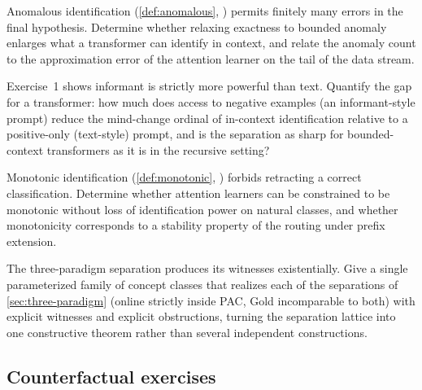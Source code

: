 \begin{openprob}
\label{op:anomalous-icl}
Anomalous identification (\cref{def:anomalous}, ) permits finitely many errors in the final hypothesis.  Determine whether relaxing exactness to bounded anomaly enlarges what a transformer can identify in context, and relate the anomaly count to the approximation error of the attention learner on the tail of the data stream.
\end{openprob}

\begin{openprob}
\label{op:informant-attention}
Exercise~1 shows informant is strictly more powerful than text.  Quantify the gap for a transformer: how much does access to negative examples (an informant-style prompt) reduce the mind-change ordinal of in-context identification relative to a positive-only (text-style) prompt, and is the separation as sharp for bounded-context transformers as it is in the recursive setting?
\end{openprob}

\begin{openprob}
\label{op:monotonic-icl}
Monotonic identification (\cref{def:monotonic}, ) forbids retracting a correct classification.  Determine whether attention learners can be constrained to be monotonic without loss of identification power on natural classes, and whether monotonicity corresponds to a stability property of the routing under prefix extension.
\end{openprob}

\begin{openprob}
\label{op:effective-three-paradigm}
The three-paradigm separation produces its witnesses existentially.  Give a single parameterized family of concept classes that realizes each of the separations of \cref{sec:three-paradigm} (online strictly inside PAC, Gold incomparable to both) with explicit witnesses and explicit obstructions, turning the separation lattice into one constructive theorem rather than several independent constructions.
\end{openprob}


\subsection*{Counterfactual exercises}

